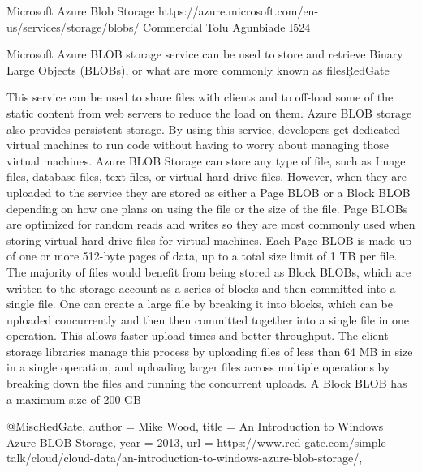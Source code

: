 Microsoft Azure Blob Storage
https://azure.microsoft.com/en-us/services/storage/blobs/
Commercial
Tolu Agunbiade
I524


Microsoft Azure BLOB storage service can be used to store and retrieve Binary Large Objects (BLOBs), or what are more commonly known as files\c{RedGate}


This service can be used to share files with clients and to off-load some of the static content from web servers to reduce the load on them. Azure BLOB storage also provides persistent storage. 
By using this service, developers get dedicated virtual machines to run code without having to worry about managing those virtual machines. 
Azure BLOB Storage can store any type of file, such as Image files, database files, text files, or virtual hard drive files. However, when they are uploaded to the service they are stored as either a Page BLOB or a Block BLOB depending on how one plans on using the file or the size of the file.
Page BLOBs are optimized for random reads and writes so they are most commonly used when storing virtual hard drive files for virtual machines. Each Page BLOB is made up of one or more 512-byte pages of data, up to a total size limit of 1 TB per file.
The majority of files would benefit from being stored as Block BLOBs, which are written to the storage account as a series of blocks and then committed into a single file. One can create a large file by breaking it into blocks, which can be uploaded concurrently and then then committed together into a single file in one operation. This allows faster upload times and better throughput. The client storage libraries manage this process by uploading files of less than 64 MB in size in a single operation, and uploading larger files across multiple operations by breaking down the files and running the concurrent uploads. A Block BLOB has a maximum size of 200 GB\cite{RedGate}


@Misc{RedGate,
 author = {Mike Wood},
 title  = {An Introduction to Windows Azure BLOB Storage},
 year   = {2013},
url = {https://www.red-gate.com/simple-talk/cloud/cloud-data/an-introduction-to-windows-azure-blob-storage/},
}
